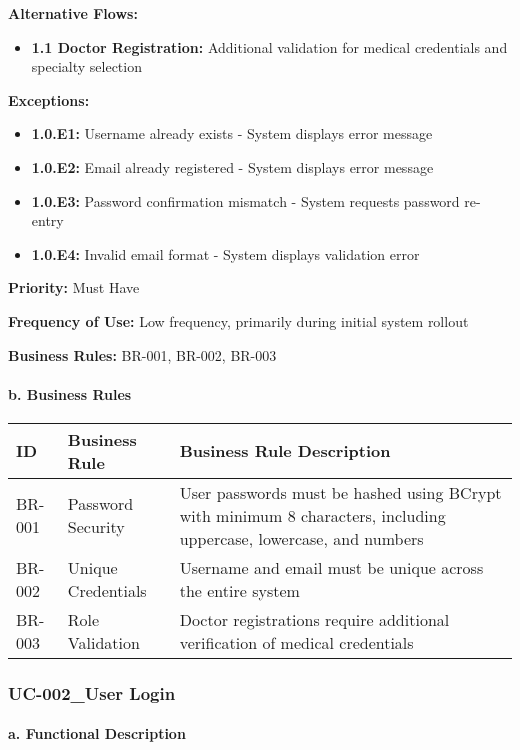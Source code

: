 \documentclass[12pt,a4paper]{article}
\begin{document}
\textbf{Alternative Flows:}
\begin{itemize}
    \item \textbf{1.1 Doctor Registration:} Additional validation for medical credentials and specialty selection
\end{itemize}

\textbf{Exceptions:}
\begin{itemize}
    \item \textbf{1.0.E1:} Username already exists - System displays error message
    \item \textbf{1.0.E2:} Email already registered - System displays error message
    \item \textbf{1.0.E3:} Password confirmation mismatch - System requests password re-entry
    \item \textbf{1.0.E4:} Invalid email format - System displays validation error
\end{itemize}

\textbf{Priority:} Must Have

\textbf{Frequency of Use:} Low frequency, primarily during initial system rollout

\textbf{Business Rules:} BR-001, BR-002, BR-003

\paragraph{b. Business Rules}

\begin{longtable}{|p{2cm}|p{4cm}|p{8cm}|}
\hline
\textbf{ID} & \textbf{Business Rule} & \textbf{Business Rule Description} \\
\hline
BR-001 & Password Security & User passwords must be hashed using BCrypt with minimum 8 characters, including uppercase, lowercase, and numbers \\
\hline
BR-002 & Unique Credentials & Username and email must be unique across the entire system \\
\hline
BR-003 & Role Validation & Doctor registrations require additional verification of medical credentials \\
\hline
\end{longtable}

\subsubsection{UC-002\_User Login}

\paragraph{a. Functional Description}
\end{document}
